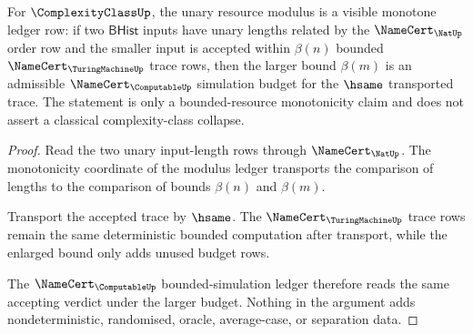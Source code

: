 \begin{theorem}
\label{thm:complexityclass-resource-modulus-monotonicity}
For $\ComplexityClassUp$, the unary resource modulus is a visible monotone
ledger row: if two $\mathsf{BHist}$ inputs have unary lengths related by the
$\NameCert_{\NatUp}$ order row and the smaller input is accepted within
$\beta(n)$ bounded $\NameCert_{\TuringMachineUp}$ trace rows, then the larger
bound $\beta(m)$ is an admissible $\NameCert_{\ComputableUp}$ simulation
budget for the $\hsame$ transported trace. The statement is only a bounded-resource
monotonicity claim and does not assert a classical complexity-class collapse.
\end{theorem}
\begin{proof}
Read the two unary input-length rows through $\NameCert_{\NatUp}$. The
monotonicity coordinate of the modulus ledger transports the comparison of
lengths to the comparison of bounds $\beta(n)$ and $\beta(m)$.

Transport the accepted trace by $\hsame$. The
$\NameCert_{\TuringMachineUp}$ trace rows remain the same deterministic
bounded computation after transport, while the enlarged bound only adds unused
budget rows.

The $\NameCert_{\ComputableUp}$ bounded-simulation ledger therefore reads the
same accepting verdict under the larger budget. Nothing in the argument adds
nondeterministic, randomised, oracle, average-case, or separation data.
\end{proof}

